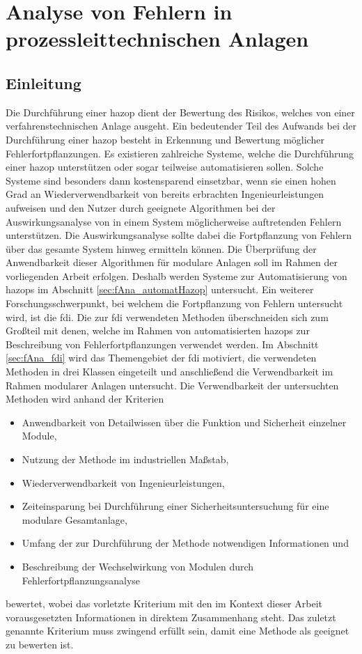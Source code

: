 \chapter{Analyse von Fehlern in prozessleittechnischen Anlagen} \label{ch:fehlerfortpfl}
\section{Einleitung}
Die Durchf\"uhrung einer \ac{hazop} dient der Bewertung des Risikos, welches von einer verfahrenstechnischen Anlage ausgeht. Ein bedeutender Teil des Aufwands bei der Durchf\"uhrung einer \ac{hazop} besteht in Erkennung und Bewertung m\"oglicher Fehlerfortpflanzungen. \newline
Es existieren zahlreiche Systeme, welche die Durchf\"uhrung einer \ac{hazop} unterst\"utzen oder sogar teilweise automatisieren sollen. Solche Systeme sind besonders dann kostensparend einsetzbar, wenn sie einen hohen Grad an Wiederverwendbarkeit von bereits erbrachten Ingenieurleistungen aufweisen und den Nutzer durch geeignete Algorithmen bei der Auswirkungsanalyse von in einem System m\"oglicherweise auftretenden Fehlern unterst\"utzen. Die Auswirkungsanalyse sollte dabei die Fortpflanzung von Fehlern \"uber das gesamte System hinweg ermitteln k\"onnen. Die \"Uberpr\"ufung der Anwendbarkeit dieser Algorithmen f\"ur modulare Anlagen soll im Rahmen der vorliegenden Arbeit erfolgen. Deshalb werden Systeme zur Automatisierung von \acp{hazop} im Abschnitt \ref{sec:fAna_automatHazop} untersucht. \newline
Ein weiterer Forschungsschwerpunkt, bei welchem die Fortpflanzung von Fehlern untersucht wird, ist die \acf{fdi}. Die zur \ac{fdi} verwendeten Methoden \"uberschneiden sich zum Gro\ss{}teil mit denen, welche im Rahmen von automatisierten \acp{hazop} zur Beschreibung von Fehlerfortpflanzungen verwendet werden. Im Abschnitt \ref{sec:fAna_fdi} wird das Themengebiet der \ac{fdi} motiviert, die verwendeten Methoden in drei Klassen eingeteilt und anschlie\ss{}end die Verwendbarkeit im Rahmen modularer Anlagen untersucht. Die Verwendbarkeit der untersuchten Methoden wird anhand der Kriterien 
\begin{itemize}
\item Anwendbarkeit von Detailwissen \"uber die Funktion und Sicherheit einzelner Module,
\item Nutzung der Methode im industriellen Ma\ss{}stab, 
\item Wiederverwendbarkeit von Ingenieurleistungen,
\item Zeiteinsparung bei Durchf\"uhrung einer Sicherheitsuntersuchung f\"ur eine modulare Gesamtanlage,
\item Umfang der zur Durchf\"uhrung der Methode notwendigen Informationen und
\item Beschreibung der Wechselwirkung von Modulen durch Fehlerfortpflanzungsanalyse
\end{itemize} bewertet, wobei das vorletzte Kriterium mit den im Kontext dieser Arbeit vorausgesetzten Informationen in direktem Zusammenhang steht. Das zuletzt genannte Kriterium muss zwingend erf\"ullt sein, damit eine Methode als geeignet zu bewerten ist.
 
